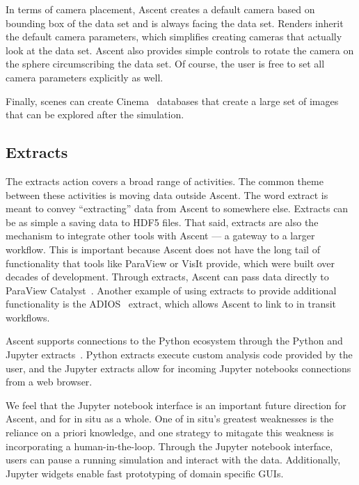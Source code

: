 In terms of camera placement,
Ascent creates a default camera based on bounding box of the data set and
is always facing the data set.
%
Renders inherit the default camera parameters, which simplifies creating
cameras that actually look at the data set.
%
Ascent also provides simple controls to rotate the camera on the
sphere circumscribing the data set.
%
Of course, the user is free to set all
camera parameters explicitly as well.

Finally, scenes can create Cinema~\cite{AhrensCinema} databases that
create a large set of images that can be explored after the simulation.


\subsection{Extracts}
The extracts action covers a broad range of activities.
%
The common theme between these activities is moving data outside Ascent.
%
The word extract is meant to convey ``extracting'' data from Ascent to somewhere else.
%
%
%
Extracts can be as simple a saving data to HDF5 files.
%
That said, extracts are also the mechanism to integrate other tools with Ascent --- a gateway
to a larger workflow.
%
This is important because
Ascent does not have the long tail of functionality that tools like ParaView or VisIt provide, which
were built over decades of development.
%
Through extracts, Ascent can pass data directly to ParaView Catalyst~\cite{Catalyst}.
%
Another example of using extracts to provide additional functionality is the
ADIOS~\cite{Lofstead2008} extract, which allows Ascent to link to in transit workflows.

Ascent supports connections to the Python ecosystem through the Python and
Jupyter extracts~\cite{CyrusISAV,Jupyter}.
%
Python extracts execute custom analysis code provided by the user, and the
Jupyter extracts allow for incoming Jupyter notebooks connections from a web
browser.

We feel that the Jupyter notebook interface is an important future direction
for Ascent, and for in situ as a whole.
%
One of in situ's greatest weaknesses is the reliance on a priori
knowledge, and one strategy to mitagate this weakness is incorporating a human-in-the-loop.
%
Through the Jupyter notebook interface, users can pause a running simulation
and interact with the data.
%
Additionally, Jupyter widgets enable fast prototyping of domain specific GUIs.


